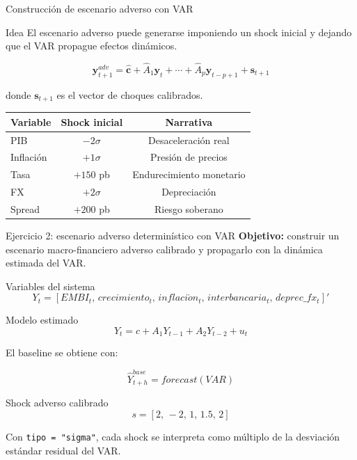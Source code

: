 \documentclass[10pt,aspectratio=169]{beamer}
\begin{document}
\begin{frame}{Construcción de escenario adverso con VAR}
\begin{block}{Idea}
El escenario adverso puede generarse imponiendo un shock inicial y dejando que el VAR propague efectos dinámicos.
\end{block}

\[
\bm y_{t+1}^{adv} =
\hat{\bm c} + \hat A_1 \bm y_t + \cdots + \hat A_p \bm y_{t-p+1}
+ \bm s_{t+1}
\]

donde $\bm s_{t+1}$ es el vector de choques calibrados.

\vspace{0.6em}
\begin{table}
\small
\begin{tabular}{lcc}
\toprule
Variable & Shock inicial & Narrativa \\
\midrule
PIB & $-2\sigma$ & Desaceleración real \\
Inflación & $+1\sigma$ & Presión de precios \\
Tasa & $+150$ pb & Endurecimiento monetario \\
FX & $+2\sigma$ & Depreciación \\
Spread & $+200$ pb & Riesgo soberano \\
\bottomrule
\end{tabular}
\end{table}
\end{frame}

\begin{frame}{Ejercicio 2: escenario adverso determinístico con VAR}
\footnotesize
\textbf{Objetivo:} construir un escenario macro-financiero adverso calibrado y propagarlo con la dinámica estimada del VAR.

\vspace{0.2cm}

\begin{block}{Variables del sistema}
\[
Y_t =
\left[
EMBI_t,\,
crecimiento_t,\,
inflaci\acute{o}n_t,\,
interbancaria_t,\,
deprec\_fx_t
\right]'
\]
\end{block}

\begin{block}{Modelo estimado}
\[
Y_t = c + A_1Y_{t-1} + A_2Y_{t-2} + u_t
\]

El baseline se obtiene con:

\[
\widehat{Y}_{t+h}^{base} = forecast(VAR)
\]
\end{block}

\begin{alertblock}{Shock adverso calibrado}
\[
s =
\left[
2,\,-2,\,1,\,1.5,\,2
\right]
\]

Con \texttt{tipo = "sigma"}, cada shock se interpreta como múltiplo de la desviación estándar residual del VAR.
\end{alertblock}

\end{frame}
\end{document}
